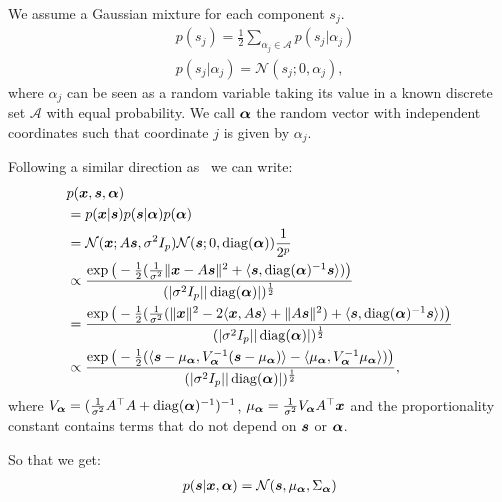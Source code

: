 We assume a Gaussian mixture for each component $s_j$.
\begin{align}
  &p(s_j) = \frac12 \sum_{\alpha_j \in \mathcal{A}} p(s_j | \alpha_j) \\
  &p(s_j | \alpha_j) = \mathcal{N}( s_j; 0, \alpha_j),
\end{align}
where $\alpha_j$ can be seen as a random variable taking its value in a known
discrete set $\mathcal{A}$ with equal probability. We call $\boldsymbol{\alpha}$ the random vector with
independent coordinates such that coordinate $j$ is given by $\alpha_j$.

Following a similar direction as~\cite{moulines1997maximum} we can write:
\begin{align}
  &p(\boldsymbol{x}, \boldsymbol{s}, \boldsymbol{\alpha}) \\
  &= p(\boldsymbol{x} | \boldsymbol{s}) p(\boldsymbol{s}|\boldsymbol{\alpha})p(\boldsymbol{\alpha}) \\
                        &= \mathcal{N}(\boldsymbol{x}; A\boldsymbol{s}, \sigma^2 I_p)\mathcal{N}( \boldsymbol{s}; 0, \operatorname*{diag}(\boldsymbol{\alpha})) \frac1{2^p} \\
  &\propto \frac{\exp\big(-\frac12(\frac1{ \sigma^2}\|\boldsymbol{x} - A\boldsymbol{s} \|^2 + \langle{ \boldsymbol{s}},{ \operatorname*{diag}(\boldsymbol{\alpha})^{-1} \boldsymbol{s}}\rangle)\big)}{(|\sigma^2 I_p| |\operatorname*{diag}(\boldsymbol{\alpha})|)^{\frac12}}  \\
  &= \frac{\exp\big(-\frac12(\frac1{ \sigma^2}(\|\boldsymbol{x} \|^2 - 2 \langle{ \boldsymbol{x}},{ A \boldsymbol{s} }\rangle + \|A \boldsymbol{s} \|^2)  + \langle{ \boldsymbol{s}},{ \operatorname*{diag}(\boldsymbol{\alpha})^{-1} \boldsymbol{s}}\rangle) \big)}{(|\sigma^2 I_p| |\operatorname*{diag}(\boldsymbol{\alpha})|)^{\frac12}} \\
  &\propto \frac{\exp\big(-\frac12( \langle{ \boldsymbol{s}- \mu_{\boldsymbol{\alpha}}},{ V_{\boldsymbol{\alpha}}^{-1} (\boldsymbol{s} - \mu_{\boldsymbol{\alpha}}) }\rangle - \langle{ \mu_{\boldsymbol{\alpha}} },{V_{\boldsymbol{\alpha}}^{-1} \mu_{\boldsymbol{\alpha}} }\rangle) \big)}{(|\sigma^2 I_p| |\operatorname*{diag}(\boldsymbol{\alpha})|)^{\frac12}},
\end{align}
where $V_{\boldsymbol{\alpha}} = (\frac1{\sigma^2}A^{\top}A + \operatorname*{diag}(\boldsymbol{\alpha})^{-1})^{-1}$, $\mu_{\boldsymbol{\alpha}} = \frac1{\sigma^2}V_{\boldsymbol{\alpha}}
A^{\top} \boldsymbol{x}$ and the proportionality constant contains terms that do not depend
on $\boldsymbol{s}$ or $\boldsymbol{\alpha}$.

So that we get:
\begin{align}
  p(\boldsymbol{s} | \boldsymbol{x}, \boldsymbol{\alpha}) =  \mathcal{N}(\boldsymbol{s}, \mu_{\boldsymbol{\alpha}}, \Sigma_{\boldsymbol{\alpha}})
\end{align}

